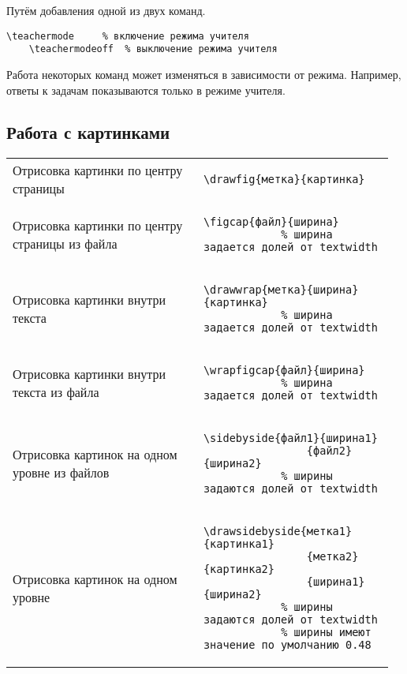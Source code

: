 Путём добавления одной из двух команд.

\begin{lstlisting}[gobble = 3]
    \teachermode     % включение режима учителя
    \teachermodeoff  % выключение режима учителя
\end{lstlisting}

Работа некоторых команд может изменяться в зависимости от режима. Например, ответы к задачам показываются
только в режиме учителя.


\subsection{Работа с картинками}

\noindent
\begin{tabular}{S{0.48\linewidth} S{0.485\linewidth}}
    Отрисовка картинки по центру страницы &
        \begin{lstlisting}[style = listtable, gobble = 10]
            \drawfig{метка}{картинка}
        \end{lstlisting} \\
    Отрисовка картинки по центру страницы из файла &
        \begin{lstlisting}[style = listtable, gobble = 10]
            \figcap{файл}{ширина}
            % ширина задается долей от textwidth
        \end{lstlisting} \\
    Отрисовка картинки внутри текста &
        \begin{lstlisting}[style = listtable, gobble = 10]
            \drawwrap{метка}{ширина}{картинка}
            % ширина задается долей от textwidth
        \end{lstlisting} \\
    Отрисовка картинки внутри текста из файла &
        \begin{lstlisting}[style = listtable, gobble = 10]
            \wrapfigcap{файл}{ширина}
            % ширина задается долей от textwidth
        \end{lstlisting} \\
    Отрисовка картинок на одном уровне из файлов &
        \begin{lstlisting}[style = listtable, gobble = 10]
            \sidebyside{файл1}{ширина1}
                {файл2}{ширина2}
            % ширины задаются долей от textwidth
        \end{lstlisting} \\
    Отрисовка картинок на одном уровне &
        \begin{lstlisting}[style = listtable, gobble = 10]
            \drawsidebyside{метка1}{картинка1}
                {метка2}{картинка2}
                {ширина1}{ширина2}
            % ширины задаются долей от textwidth
            % ширины имеют значение по умолчанию 0.48
        \end{lstlisting} \\
\end{tabular}
